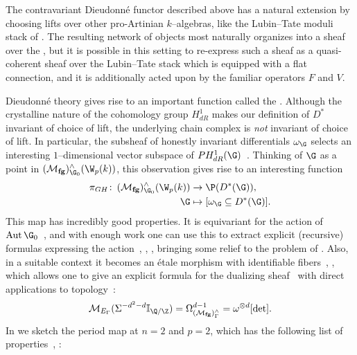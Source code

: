 \begin{remark}
The contravariant Dieudonn\'e functor described above has a natural extension by choosing lifts over other pro-Artinian $k$--algebras, like the Lubin--Tate moduli stack of .  The resulting network of objects most naturally organizes into a sheaf over the , but it is possible in this setting to re-express such a sheaf as a quasi-coherent sheaf over the Lubin--Tate stack which is equipped with a flat connection, and it is additionally acted upon by the familiar operators $F$ and $V$.
\end{remark}

\begin{remark}\label{ThePeriodMapSection}
Dieudonn\'e theory gives rise to an important function called the .  Although the crystalline nature of the cohomology group $H^1_{dR}$ makes our definition of $D^*$ invariant of choice of lift, the underlying chain complex is \emph{not} invariant of choice of lift.  In particular, the subsheaf of honestly invariant differentials $\omega_{\G}$ selects an interesting $1$--dimensional vector subspace of $PH^1_{dR}(\G)$~\cite[Section 2.3]{MoravaCobordismComodules}.  Thinking of $\G$ as a point in $(\moduli{fg})^\wedge_{\G_0}(\W_p(k))$, this observation gives rise to an interesting function
\begin{align*}
\pi_{GH}\co (\moduli{fg})^\wedge_{\G_0}(\W_p(k)) & \to \P(D^*(\G)), \\
\G & \mapsto [\omega_{\G} \subseteq D^*(\G)].
\end{align*}
This map has incredibly good properties.  It is equivariant for the action of $\Aut \G_0$~\cite[Theorem 1]{HopkinsGrossAnnouncement}, and with enough work one can use this to extract explicit (recursive) formulas expressing the action~\cite{DevinatzHopkins}, \cite[Section 24]{StricklandFPFP}, \cite[Section 22]{HopkinsGrossEquivVBs}, bringing some relief to the problem of .  Also, in a suitable context it becomes an \'etale morphism with identifiable fibers~\cite[Theorem 1]{HopkinsGrossAnnouncement}, \cite[Sections 23-4]{HopkinsGrossEquivVBs}, which allows one to give an explicit formula for the dualizing sheaf~\cite[Corollary 3]{HopkinsGrossAnnouncement} with direct applications to topology~\cite[Theorem 6]{HopkinsGrossAnnouncement}: \[\context{E_\Gamma}(\Susp^{-d^2 - d} \mathbb I_{\Q/\Z}) = \Omega^{d - 1}_{(\moduli{fg})^\wedge_\Gamma} = \omega^{\otimes d}[\det].\]  In  we sketch the period map at $n = 2$ and $p = 2$, which has the following list of properties~\cite[Appendix 25]{HopkinsGrossEquivVBs}, \cite{Yu}:

\end{remark}
